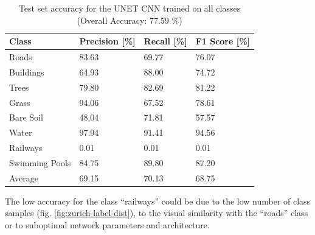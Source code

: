 \documentclass[10pt]{article}
\begin{document}
\begin{table}[H]
    \centering
    \begin{tabular}{llll}
    \toprule
    Class            & Precision [\%] & Recall [\%] & F1 Score [\%] \\ \midrule
    Roads          &      83.63 &   69.77 &     76.07 \\
    Buildings      &      64.93 &   88.00 &     74.72 \\
    Trees          &      79.80 &   82.69 &     81.22 \\
    Grass          &      94.06 &   67.52 &     78.61 \\
    Bare Soil      &      48.04 &   71.81 &     57.57 \\
    Water          &      97.94 &   91.41 &     94.56 \\
    Railways       &       0.01 &    0.01 &      0.01 \\
    Swimming Pools &      84.75 &   89.80 &     87.20 \\ \midrule
    Average        & 69.15     & 70.13  & 68.75  \\ \bottomrule
    \end{tabular}
    \caption{Test set accuracy for the UNET \gls{CNN} trained on all classes (Overall Accuracy:  77.59 \%)}
    \label{table:zurich-cnn-acc-all}
\end{table}
The low accuracy for the class ``railways'' could be due to the low number of class samples (fig. \ref{fig:zurich-label-dist}), to the visual similarity with the ``roads'' class or to suboptimal network parameters and architecture. 
\end{document}
